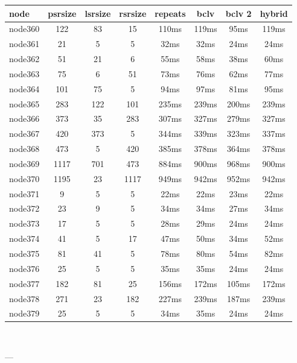 \begin{tabular}{|l|c|c|c|c|c|c|c|}
\hline node & psrsize & lsrsize & rsrsize   & repeats & bclv & bclv 2 & hybrid\\
    \hline node360 & 122 & 83 & 15 & 110ms & 119ms & 95ms & 119ms\\
    \hline node361 & 21 & 5 & 5 & 32ms & 32ms & 24ms & 24ms\\
    \hline node362 & 51 & 21 & 6 & 55ms & 58ms & 38ms & 60ms\\
    \hline node363 & 75 & 6 & 51 & 73ms & 76ms & 62ms & 77ms\\
    \hline node364 & 101 & 75 & 5 & 94ms & 97ms & 81ms & 95ms\\
    \hline node365 & 283 & 122 & 101 & 235ms & 239ms & 200ms & 239ms\\
    \hline node366 & 373 & 35 & 283 & 307ms & 327ms & 279ms & 327ms\\
    \hline node367 & 420 & 373 & 5 & 344ms & 339ms & 323ms & 337ms\\
    \hline node368 & 473 & 5 & 420 & 385ms & 378ms & 364ms & 378ms\\
    \hline node369 & 1117 & 701 & 473 & 884ms & 900ms & 968ms & 900ms\\
    \hline node370 & 1195 & 23 & 1117 & 949ms & 942ms & 952ms & 942ms\\
    \hline node371 & 9 & 5 & 5 & 22ms & 22ms & 23ms & 22ms\\
    \hline node372 & 23 & 9 & 5 & 34ms & 34ms & 27ms & 34ms\\
    \hline node373 & 17 & 5 & 5 & 28ms & 29ms & 24ms & 24ms\\
    \hline node374 & 41 & 5 & 17 & 47ms & 50ms & 34ms & 52ms\\
    \hline node375 & 81 & 41 & 5 & 78ms & 80ms & 54ms & 82ms\\
    \hline node376 & 25 & 5 & 5 & 35ms & 35ms & 24ms & 24ms\\
    \hline node377 & 182 & 81 & 25 & 156ms & 172ms & 105ms & 172ms\\
    \hline node378 & 271 & 23 & 182 & 227ms & 239ms & 187ms & 239ms\\
    \hline node379 & 25 & 5 & 5 & 34ms & 35ms & 24ms & 24ms\\

\hline
\end{tabular} \

---


